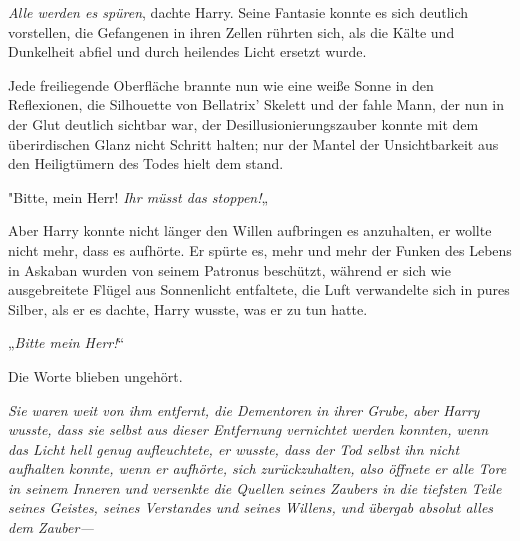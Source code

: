 \emph{Alle werden es spüren}, dachte Harry. Seine Fantasie konnte es sich deutlich vorstellen, die Gefangenen in ihren Zellen rührten sich, als die Kälte und Dunkelheit abfiel und durch heilendes Licht ersetzt wurde.

Jede freiliegende Oberfläche brannte nun wie eine weiße Sonne in den Reflexionen, die Silhouette von Bellatrix' Skelett und der fahle Mann, der nun in der Glut deutlich sichtbar war, der Desillusionierungszauber konnte mit dem überirdischen Glanz nicht Schritt halten; nur der Mantel der Unsichtbarkeit aus den Heiligtümern des Todes hielt dem stand.

"Bitte, mein Herr! \emph{Ihr müsst das stoppen!}„

Aber Harry konnte nicht länger den Willen aufbringen es anzuhalten, er wollte nicht mehr, dass es aufhörte. Er spürte es, mehr und mehr der Funken des Lebens in Askaban wurden von seinem Patronus beschützt, während er sich wie ausgebreitete Flügel aus Sonnenlicht entfaltete, die Luft verwandelte sich in pures Silber, als er es dachte, Harry wusste, was er zu tun hatte.

„\emph{Bitte mein Herr!}“

Die Worte blieben ungehört.

\emph{Sie waren weit von ihm entfernt, die Dementoren in ihrer Grube, aber Harry wusste, dass sie selbst aus dieser Entfernung vernichtet werden konnten, wenn das Licht hell genug aufleuchtete, er wusste, dass der Tod selbst ihn nicht aufhalten konnte, wenn er aufhörte, sich zurückzuhalten, also öffnete er alle Tore in seinem Inneren und versenkte die Quellen seines Zaubers in die tiefsten Teile seines Geistes, seines Verstandes und seines Willens, und übergab absolut alles dem Zauber—}

